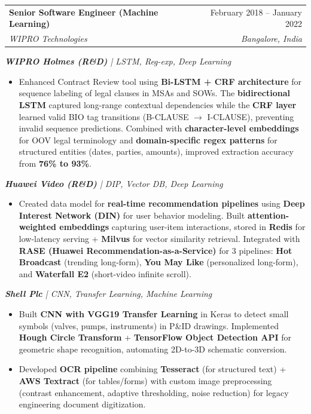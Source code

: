 \documentclass[letterpaper,10pt]{article}
\makeatletter
\newcommand{\resumeItem}[1]{
  \item\small{
    {#1 \vspace{-2pt}}
  }
}
\newcommand{\resumeSubheading}[4]{
  \vspace{-2pt}\item
    \begin{tabular*}{0.97\textwidth}[t]{l@{\extracolsep{\fill}}r}
      \textbf{#1} & #2 \\
      \textit{\small#3} & \textit{\small #4} \\
    \end{tabular*}\vspace{-7pt}
}
\newcommand{\resumeItemListStart}{\begin{itemize}}
\newcommand{\resumeItemListEnd}{\end{itemize}\vspace{-5pt}}
\makeatother
\begin{document}
      \vspace{12pt}
      \vspace{12pt}
      \vspace{12pt}
    \resumeSubheading
      {Senior Software Engineer (Machine Learning)}{February 2018 -- January 2022}
      {WIPRO Technologies}{Bangalore, India}
      
      \vspace{12pt}
      \vspace{12pt}
      \textit{\small\textbf{WIPRO Holmes (R\&D)} | LSTM, Reg-exp, Deep Learning}
      \resumeItemListStart
        \resumeItem{Enhanced Contract Review tool using \textbf{Bi-LSTM + CRF architecture} for sequence labeling of legal clauses in MSAs and SOWs. The \textbf{bidirectional LSTM} captured long-range contextual dependencies while the \textbf{CRF layer} learned valid BIO tag transitions (B-CLAUSE $\rightarrow$ I-CLAUSE), preventing invalid sequence predictions. Combined with \textbf{character-level embeddings} for OOV legal terminology and \textbf{domain-specific regex patterns} for structured entities (dates, parties, amounts), improved extraction accuracy from \textbf{76\% to 93\%}.}
        \resumeItemListEnd

      \vspace{12pt}
      \textit{\small\textbf{Huawei Video (R\&D)} | DIP, Vector DB, Deep Learning}
      \resumeItemListStart
        \resumeItem{Created data model for \textbf{real-time recommendation pipelines} using \textbf{Deep Interest Network (DIN)} for user behavior modeling. Built \textbf{attention-weighted embeddings} capturing user-item interactions, stored in \textbf{Redis} for low-latency serving + \textbf{Milvus} for vector similarity retrieval. Integrated with \textbf{RASE (Huawei Recommendation-as-a-Service)} for 3 pipelines: \textbf{Hot Broadcast} (trending long-form), \textbf{You May Like} (personalized long-form), and \textbf{Waterfall E2} (short-video infinite scroll).}
        \resumeItemListEnd
        
      \vspace{12pt}
      \textit{\small\textbf{Shell Plc} | CNN, Transfer Learning, Machine Learning}
      \resumeItemListStart
        \resumeItem{Built \textbf{CNN with VGG19 Transfer Learning} in Keras to detect small symbols (valves, pumps, instruments) in P\&ID drawings. Implemented \textbf{Hough Circle Transform} + \textbf{TensorFlow Object Detection API} for geometric shape recognition, automating 2D-to-3D schematic conversion.}
        \resumeItem{Developed \textbf{OCR pipeline} combining \textbf{Tesseract} (for structured text) + \textbf{AWS Textract} (for tables/forms) with custom image preprocessing (contrast enhancement, adaptive thresholding, noise reduction) for legacy engineering document digitization.}
      \resumeItemListEnd
\end{document}

